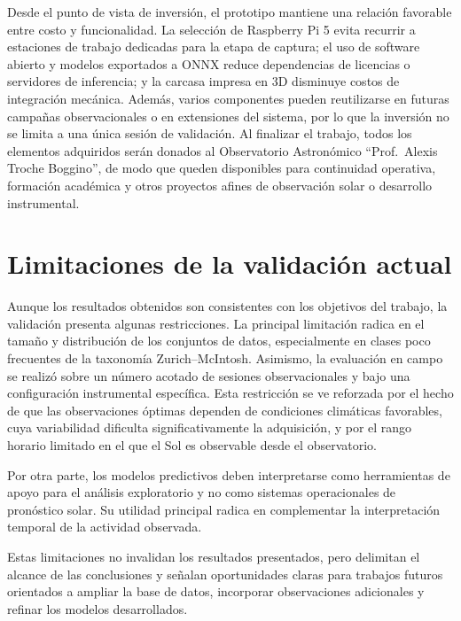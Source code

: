 Desde el punto de vista de inversión, el prototipo mantiene una relación
favorable entre costo y funcionalidad. La selección de Raspberry Pi 5 evita
recurrir a estaciones de trabajo dedicadas para la etapa de captura; el uso de
software abierto y modelos exportados a ONNX reduce dependencias de licencias o
servidores de inferencia; y la carcasa impresa en 3D disminuye costos de
integración mecánica. Además, varios componentes pueden reutilizarse en futuras
campañas observacionales o en extensiones del sistema, por lo que la inversión no
se limita a una única sesión de validación. Al finalizar el trabajo, todos los
elementos adquiridos serán donados al Observatorio Astronómico ``Prof.~Alexis
Troche Boggino'', de modo que queden disponibles para continuidad operativa,
formación académica y otros proyectos afines de observación solar o desarrollo
instrumental.

\section{Limitaciones de la validación actual}

Aunque los resultados obtenidos son consistentes con los objetivos del trabajo,
la validación presenta algunas restricciones. La principal limitación radica en el
tamaño y distribución de los conjuntos de datos, especialmente en clases poco
frecuentes de la taxonomía Zurich--McIntosh. Asimismo, la evaluación en campo
se realizó sobre un número acotado de sesiones observacionales y bajo una
configuración instrumental específica. Esta restricción se ve reforzada por el
hecho de que las observaciones óptimas dependen de condiciones climáticas
favorables, cuya variabilidad dificulta significativamente la adquisición, y por
el rango horario limitado en el que el Sol es observable desde el observatorio.

Por otra parte, los modelos predictivos deben interpretarse como herramientas
de apoyo para el análisis exploratorio y no como sistemas operacionales de
pronóstico solar. Su utilidad principal radica en complementar la interpretación
temporal de la actividad observada.

Estas limitaciones no invalidan los resultados presentados, pero delimitan el
alcance de las conclusiones y señalan oportunidades claras para trabajos
futuros orientados a ampliar la base de datos, incorporar observaciones
adicionales y refinar los modelos desarrollados.